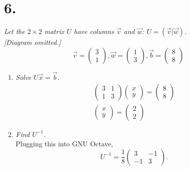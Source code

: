 \documentclass[12pt]{article}
\begin{document}
\section*{6.}
\textit{Let the $2 \times 2$ matrix $U$ have columns $\vec{v}$ and $\vec{w}$:
$U = (\vec{v} | \vec{w})$. \\ {[Diagram omitted.]}}
\begin{equation*}
	\vec{v} = \begin{pmatrix} 3 \\ 1 \end{pmatrix}
	,
	\vec{w} = \begin{pmatrix} 1 \\ 3 \end{pmatrix}
	,
	\vec{b} = \begin{pmatrix} 8 \\ 8 \end{pmatrix}
\end{equation*}
\begin{enumerate}[label=(\alph*)]
	\item \textit{Solve $U\vec{x} = \vec{b}$.}
	\begin{gather*}
		\begin{pmatrix}
			3 & 1 \\
			1 & 3
		\end{pmatrix}
		\begin{pmatrix} x \\ y \end{pmatrix}
		=
		\begin{pmatrix} 8 \\ 8 \end{pmatrix}
		\\
		\boxed{
			\begin{pmatrix} x \\ y \end{pmatrix}
			=
			\begin{pmatrix} 2 \\ 2 \end{pmatrix}
		}
	\end{gather*}
	
	\item \textit{Find $U^{-1}$.} \\[\baselineskip]
	Plugging this into GNU Octave,
	\begin{equation*}
		U^{-1} =
		\boxed{
			\frac{1}{8}
			\begin{pmatrix}
				3 & -1 \\
				-1 & 3
			\end{pmatrix}
		}
		.
	\end{equation*}
\end{enumerate}
\end{document}
